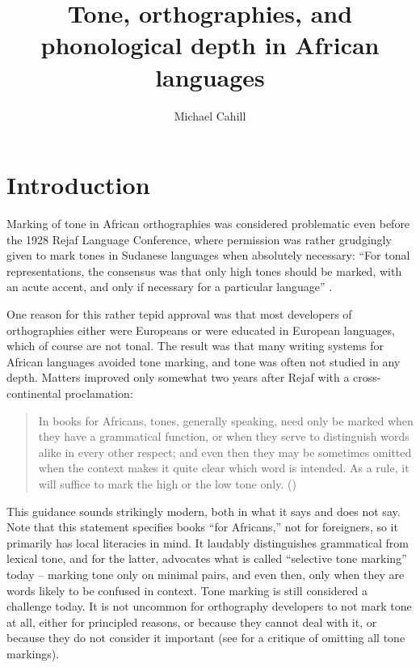 \documentclass[output=paper]{langscibook}
\title{Tone, orthographies, and phonological depth in African languages}
\author{Michael Cahill}
\begin{document}
\maketitle

\section{Introduction}\label{sec:Introduction:1}

Marking of tone in African orthographies was considered problematic even before the 1928 Rejaf Language Conference, where permission was rather grudgingly given to mark tones in Sudanese languages when absolutely necessary: “For tonal representations, the consensus was that only high tones should be marked, with an acute accent, and only if necessary for a particular language” \citep{Miner2003}.

One reason for this rather tepid approval was that most developers of orthographies either were Europeans or were educated in European languages, which of course are not tonal. The result was that many writing systems for African languages avoided tone marking, and tone was often not studied in any depth. Matters improved only somewhat two years after Rejaf with a cross-continental proclamation: 

\begin{quote}
In books for Africans, tones, generally speaking, need only be marked when they have a grammatical function, or when they serve to distinguish words alike in every other respect; and even then they may be sometimes omitted when the context makes it quite clear which word is intended. As a rule, it will suffice to mark the high or the low tone only. (\citealt[14, referring to Rejaf and 12 other documents]{IIALC1930})
\end{quote}

This guidance sounds strikingly modern, both in what it says and does not say. Note that this statement specifies books “for Africans,” not for foreigners, so it primarily has local literacies in mind. It laudably distinguishes grammatical from lexical tone, and for the latter, advocates what is called “selective tone marking” today -- marking tone only on minimal pairs, and even then, only when they are words likely to be confused in context. Tone marking is still considered a challenge today. It is not uncommon for orthography developers to not mark tone at all, either for principled reasons, or because they cannot deal with it, or because they do not consider it important (see \citealt{Cahill2000} for a critique of omitting all tone markings).
\end{document}
